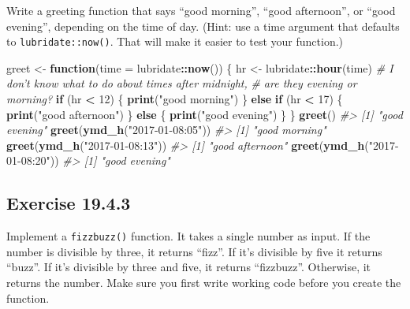 \documentclass[]{book}
\newenvironment{Shaded}{\begin{snugshade}}{\end{snugshade}}
\newcommand{\CommentTok}[1]{\textcolor[rgb]{0.56,0.35,0.01}{\textit{#1}}}
\newcommand{\ControlFlowTok}[1]{\textcolor[rgb]{0.13,0.29,0.53}{\textbf{#1}}}
\newcommand{\DataTypeTok}[1]{\textcolor[rgb]{0.13,0.29,0.53}{#1}}
\newcommand{\DecValTok}[1]{\textcolor[rgb]{0.00,0.00,0.81}{#1}}
\newcommand{\KeywordTok}[1]{\textcolor[rgb]{0.13,0.29,0.53}{\textbf{#1}}}
\newcommand{\NormalTok}[1]{#1}
\newcommand{\OperatorTok}[1]{\textcolor[rgb]{0.81,0.36,0.00}{\textbf{#1}}}
\newcommand{\StringTok}[1]{\textcolor[rgb]{0.31,0.60,0.02}{#1}}
\theoremstyle{plain}
\theoremstyle{remark}
\begin{document}
Write a greeting function that says ``good morning'', ``good
afternoon'', or ``good evening'', depending on the time of day. (Hint:
use a time argument that defaults to \texttt{lubridate::now()}. That
will make it easier to test your function.)

\begin{Shaded}
\begin{Highlighting}[]
\NormalTok{greet <-}\StringTok{ }\ControlFlowTok{function}\NormalTok{(}\DataTypeTok{time =}\NormalTok{ lubridate}\OperatorTok{::}\KeywordTok{now}\NormalTok{()) \{}
\NormalTok{  hr <-}\StringTok{ }\NormalTok{lubridate}\OperatorTok{::}\KeywordTok{hour}\NormalTok{(time)}
  \CommentTok{# I don't know what to do about times after midnight,}
  \CommentTok{# are they evening or morning?}
  \ControlFlowTok{if}\NormalTok{ (hr }\OperatorTok{<}\StringTok{ }\DecValTok{12}\NormalTok{) \{}
    \KeywordTok{print}\NormalTok{(}\StringTok{"good morning"}\NormalTok{)}
\NormalTok{  \} }\ControlFlowTok{else} \ControlFlowTok{if}\NormalTok{ (hr }\OperatorTok{<}\StringTok{ }\DecValTok{17}\NormalTok{) \{}
    \KeywordTok{print}\NormalTok{(}\StringTok{"good afternoon"}\NormalTok{)}
\NormalTok{  \} }\ControlFlowTok{else}\NormalTok{ \{}
    \KeywordTok{print}\NormalTok{(}\StringTok{"good evening"}\NormalTok{)}
\NormalTok{  \}}
\NormalTok{\}}
\KeywordTok{greet}\NormalTok{()}
\CommentTok{#> [1] "good evening"}
\KeywordTok{greet}\NormalTok{(}\KeywordTok{ymd_h}\NormalTok{(}\StringTok{"2017-01-08:05"}\NormalTok{))}
\CommentTok{#> [1] "good morning"}
\KeywordTok{greet}\NormalTok{(}\KeywordTok{ymd_h}\NormalTok{(}\StringTok{"2017-01-08:13"}\NormalTok{))}
\CommentTok{#> [1] "good afternoon"}
\KeywordTok{greet}\NormalTok{(}\KeywordTok{ymd_h}\NormalTok{(}\StringTok{"2017-01-08:20"}\NormalTok{))}
\CommentTok{#> [1] "good evening"}
\end{Highlighting}
\end{Shaded}

\hypertarget{exercise-19.4.3}{%
\subsection*{\texorpdfstring{Exercise
{19.4.3}}{Exercise 19.4.3}}\label{exercise-19.4.3}}

Implement a \texttt{fizzbuzz()} function. It takes a single number as
input. If the number is divisible by three, it returns ``fizz''. If it's
divisible by five it returns ``buzz''. If it's divisible by three and
five, it returns ``fizzbuzz''. Otherwise, it returns the number. Make
sure you first write working code before you create the function.
\end{document}

